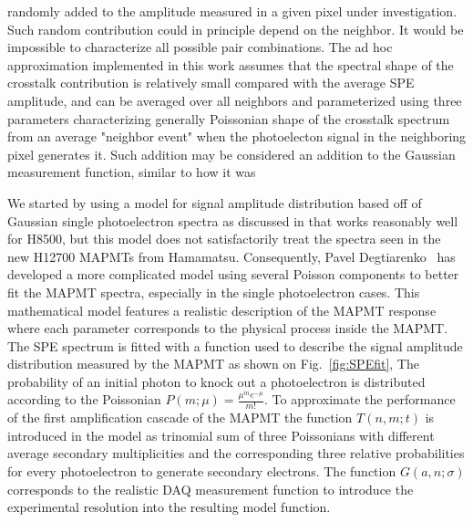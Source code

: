 randomly added to the amplitude measured in a given pixel under investigation. Such random contribution could in principle depend on the neighbor. It would be impossible to characterize all possible pair combinations. The ad hoc approximation implemented in this work assumes that the spectral shape of the crosstalk contribution is relatively small compared with the average SPE amplitude, and can be averaged over all neighbors and parameterized using three parameters characterizing generally Poissonian shape of the crosstalk spectrum from an average "neighbor event" when the photoelecton signal in the neighboring pixel generates it. Such addition may be considered an addition to the Gaussian measurement function, similar to how it was  

We started by using a model for signal amplitude distribution based off of Gaussian single photoelectron spectra as discussed in \cite{Bellamy:1994bv} that works reasonably well for H8500, but this model does not satisfactorily treat the spectra seen in the new H12700 MAPMTs from Hamamatsu. Consequently, Pavel Degtiarenko~\cite{DEGTIARENKO20171} has developed a more complicated model using several Poisson components to better fit the MAPMT spectra, especially in the single photoelectron cases.
This mathematical model features a realistic description of the MAPMT response where each parameter corresponds to the physical process inside the MAPMT.
The SPE spectrum is fitted with a function used to describe the signal amplitude distribution measured by the MAPMT as shown on Fig.~\ref{fig:SPEfit},
The probability of an initial photon to knock out a photoelectron is distributed according to the Poissonian $P(m;\mu)=\frac{\mu^me^{-\mu}}{m!}$.
To approximate the performance of the first amplification cascade of the MAPMT the function $T(n,m;t)$ is introduced in the model as trinomial sum of three Poissonians with different average secondary multiplicities and the corresponding three relative probabilities for every photoelectron to generate secondary electrons.
The function $G(a,n;\sigma)$ corresponds to the realistic DAQ measurement function to introduce the experimental resolution into the resulting model function.

